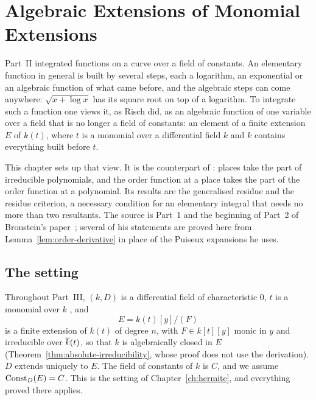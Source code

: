 \chapter[Extensions of Monomial Extensions]{Algebraic Extensions of Monomial Extensions}\label{ch:monomial}

Part~II integrated functions on a curve over a field of constants. An
elementary function in general is built by several steps, each a logarithm,
an exponential or an algebraic function of what came before, and the
algebraic steps can come anywhere: $\sqrt{x + \log x}$ has its square root on
top of a logarithm. To integrate such a function one views it, as Risch did,
as an algebraic function of one variable over a field that is no longer a
field of constants: an element of a finite extension $E$ of $k(t)$, where
$t$ is a monomial over a differential field $k$ and $k$ contains everything
built before $t$.

This chapter sets up that view. It is the counterpart of
: places take the part of irreducible polynomials,
and the order function at a place takes the part of the order function at a
polynomial. Its results are the generalised residue and the residue
criterion, a necessary condition for an elementary integral that needs no
more than two resultants. The source is Part~1 and the beginning of Part~2
of Bronstein's paper~\cite{bronstein1990}; several of his statements are
proved here from Lemma~\ref{lem:order-derivative} in place of the Puiseux
expansions he uses.

\section{The setting}\label{sec:mono-setting}

Throughout Part~III, $(k, D)$ is a differential field of characteristic $0$,
$t$ is a monomial over $k$ , and
\[
  E = k(t)[y]/(F)
\]
is a finite extension of $k(t)$ of degree $n$, with $F \in k[t][y]$ monic in
$y$ and irreducible over $\overline{k}(t)$, so that $k$ is algebraically closed in
$E$ (Theorem~\ref{thm:absolute-irreducibility}, whose proof does not use the
derivation). $D$ extends uniquely to $E$. The field of constants of $k$ is
$C$, and we assume $\operatorname{Const}_D(E) = C$. This is the setting of
Chapter~\ref{ch:hermite}, and everything proved there applies.

